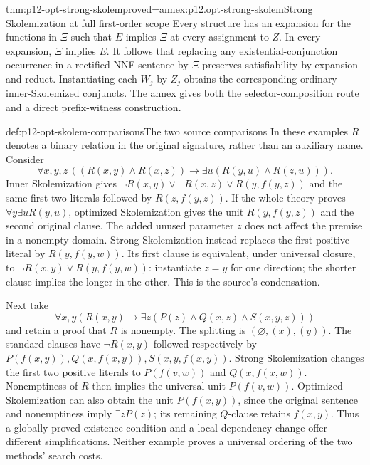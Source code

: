 \begin{hbtheorem}{thm:p12-opt-strong-skolem}{proved=annex:p12.opt-strong-skolem}{Strong Skolemization at full first-order scope}
Every structure has an expansion for the functions in \(\Xi\)
such that \(E\) implies \(\Xi\) at every assignment to \(Z\).
In every expansion, \(\Xi\) implies \(E\).
It follows that replacing any existential-conjunction occurrence in a
rectified NNF sentence by \(\Xi\) preserves satisfiability by expansion
and reduct. Instantiating each \(W_j\) by \(Z_j\) obtains the
corresponding ordinary inner-Skolemized conjuncts.
The annex gives both the selector-composition route and a direct
prefix-witness construction.
\end{hbtheorem}

\begin{hbexample}{def:p12-opt-skolem-comparisons}{The two source comparisons}
In these examples \(R\) denotes a binary relation in the original
signature, rather than an auxiliary name. Consider
\[
 \forall x,y,z\,
 ((R(x,y)\land R(x,z))\to
             \exists u(R(y,u)\land R(z,u))).
\]
Inner Skolemization gives
\(\neg R(x,y)\lor\neg R(x,z)\lor R(y,f(y,z))\)
and the same first two literals followed by \(R(z,f(y,z))\).
If the whole theory proves \(\forall y\exists uR(y,u)\),
optimized Skolemization gives the unit \(R(y,f(y,z))\)
and the second original clause. The added unused parameter \(z\)
does not affect the premise in a nonempty domain.
Strong Skolemization instead replaces the first positive literal by
\(R(y,f(y,w))\). Its first clause is equivalent, under universal
closure, to
\(\neg R(x,y)\lor R(y,f(y,w))\):
instantiate \(z=y\) for one direction; the shorter clause implies
the longer in the other. This is the source's condensation.

Next take
\[
 \forall x,y(R(x,y)\to\exists z(P(z)\land Q(x,z)\land S(x,y,z)))
\]
and retain a proof that \(R\) is nonempty. The splitting is
\((\varnothing,(x),(y))\).
The standard clauses have \(\neg R(x,y)\) followed respectively by
\(P(f(x,y)),Q(x,f(x,y)),S(x,y,f(x,y))\).
Strong Skolemization changes the first two positive literals to
\(P(f(v,w))\) and \(Q(x,f(x,w))\).
Nonemptiness of \(R\) then implies the universal unit \(P(f(v,w))\).
Optimized Skolemization can also obtain the unit \(P(f(x,y))\),
since the original sentence and nonemptiness imply \(\exists zP(z)\);
its remaining \(Q\)-clause retains \(f(x,y)\).
Thus a globally proved existence condition and a local dependency
change offer different simplifications. Neither example proves a
universal ordering of the two methods' search costs.
\end{hbexample}

